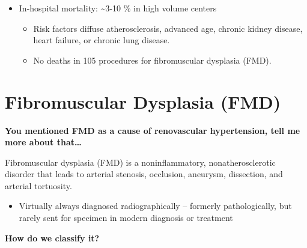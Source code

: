 \documentclass[
]{book}
\providecommand{\tightlist}{%
  \setlength{\itemsep}{0pt}\setlength{\parskip}{0pt}}
\begin{document}
\begin{itemize}
\item
  In-hospital mortality: \textasciitilde3-10 \% in high volume centers

  \begin{itemize}
  \item
    Risk factors diffuse atherosclerosis, advanced age, chronic
    kidney disease, heart failure, or chronic lung disease.
  \item
    No deaths in 105 procedures for fibromuscular dysplasia (FMD).
  \end{itemize}
\end{itemize}

\hypertarget{fibromuscular-dysplasia-fmd}{%
\section{Fibromuscular Dysplasia (FMD)}\label{fibromuscular-dysplasia-fmd}}

\textbf{You mentioned FMD as a cause of renovascular hypertension, tell me
more about that\ldots{}}

Fibromuscular dysplasia (FMD) is a noninflammatory, nonatherosclerotic
disorder that leads to arterial stenosis, occlusion, aneurysm,
dissection, and arterial tortuosity.\citep{olin2011}

\begin{itemize}
\tightlist
\item
  Virtually always diagnosed radiographically -- formerly
  pathologically, but rarely sent for specimen in modern diagnosis or
  treatment
\end{itemize}

\textbf{How do we classify it?}
\end{document}
